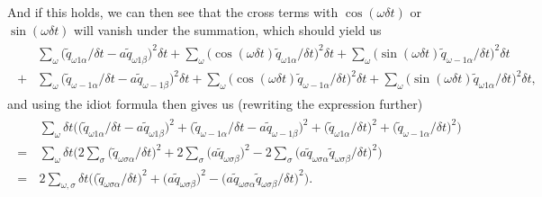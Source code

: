 \documentclass{report}
\begin{document}
And if this holds, we can then see that the cross terms with $\cos(\omega \delta t)$ or $\sin(\omega \delta t)$ will vanish under the summation, which should yield us %
\begin{align}
\begin{aligned}
	&\sum_{\omega}
		\Big(
			\tilde q_{\omega 1\alpha}  / \delta t -
			a \tilde q_{\omega 1\beta}
		\Big)^2 
		\delta t
	+
	\sum_{\omega}
		\big(
			\cos(\omega\delta t) \tilde q_{\omega 1\alpha}  / \delta t
		\big)^2 
		\delta t
	+
	\sum_{\omega}
		\big(
			\sin(\omega\delta t) \tilde q_{\omega-1\alpha} / \delta t 
		\big)^2 
		\delta t\\
	+&\sum_{\omega}
		\Big(
			\tilde q_{\omega-1\alpha}  / \delta t -
			a \tilde q_{\omega-1\beta}
		\Big)^2 
		\delta t
	+
	\sum_{\omega}
		\big(
			\cos(\omega\delta t) \tilde q_{\omega-1\alpha}  / \delta t
		\big)^2 
		\delta t
	+
	\sum_{\omega}
		\big(
			\sin(\omega\delta t) \tilde q_{\omega 1\alpha} / \delta t 
		\big)^2 
		\delta t,
\end{aligned}
\end{align}
and using the idiot formula %
then gives us (rewriting the expression further)
\begin{align}
\begin{aligned}
	&\,\sum_{\omega} \delta t \bigg(
		\big(
			\tilde q_{\omega 1\alpha}  / \delta t -
			a \tilde q_{\omega 1\beta}
		\big)^2 
		+
		\big(
			\tilde q_{\omega-1\alpha}  / \delta t -
			a \tilde q_{\omega-1\beta}
		\big)^2 
		+
		\big(
			\tilde q_{\omega 1\alpha}  / \delta t
		\big)^2 
		+
		\big(
			\tilde q_{\omega-1\alpha}  / \delta t 
		\big)^2 
	\bigg) \\
	=&\,\sum_{\omega} \delta t \bigg(
		2\sum_\sigma \big(
			\tilde q_{\omega\sigma\alpha}  / \delta t
		\big)^2 
		+
		2\sum_\sigma \big(
			a \tilde q_{\omega\sigma\beta} 
		\big)^2 
		-
		2\sum_\sigma \big(
			a \tilde q_{\omega\sigma\alpha} \tilde q_{\omega\sigma\beta} / \delta t 
		\big)^2 
	\bigg) \\
	=&\,2 \sum_{\omega,\sigma} \delta t \bigg(
		\big(
			\tilde q_{\omega\sigma\alpha}  / \delta t
		\big)^2 
		+
		\big(
			a \tilde q_{\omega\sigma\beta} 
		\big)^2 
		-
		\big(
			a \tilde q_{\omega\sigma\alpha} \tilde q_{\omega\sigma\beta} / \delta t 
		\big)^2 
	\bigg).
	\label{eq_3.53}
\end{aligned}
\end{align}
\end{document}
